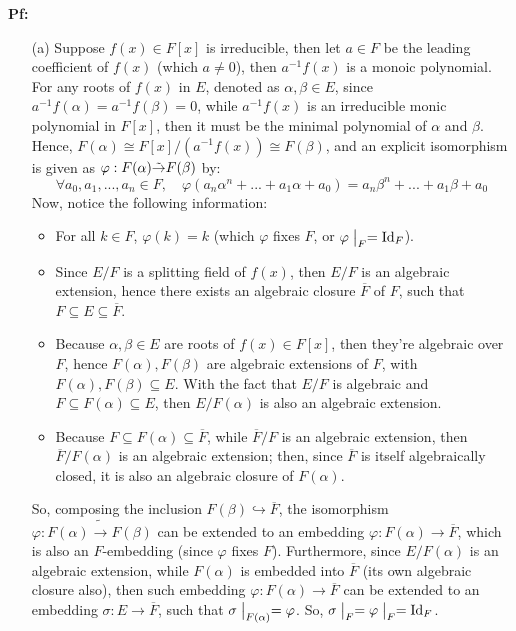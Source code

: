 \documentclass{article}
\begin{document}
\textbf{Pf:}
\begin{itemize}
    \item[(a)] Suppose $f(x)\in F[x]$ is irreducible, then let $a\in F$ be the leading coefficient of $f(x)$ (which $a\neq 0$), then $a^{-1}f(x)$ is a monoic polynomial. For any roots of $f(x)$ in $E$, denoted as $\alpha,\beta\in E$, since $a^{-1}f(\alpha)=a^{-1}f(\beta)=0$, while $a^{-1}f(x)$ is an irreducible monic polynomial in $F[x]$, then it must be the minimal polynomial of $\alpha$ and $\beta$. Hence, $F(\alpha)\cong F[x]/(a^{-1}f(x))\cong F(\beta)$, and an explicit isomorphism is given as $\varphi:F(\alpha)\Tilde{\rightarrow }F(\beta)$ by:
    $$\forall a_0,a_1,...,a_n\in F,\quad \varphi(a_n\alpha^n+...+a_1\alpha+a_0)=a_n\beta^n+...+a_1\beta+a_0$$
    Now, notice the following information:
    \begin{itemize}
        \item For all $k\in F$, $\varphi(k)=k$ (which $\varphi$ fixes $F$, or $\varphi\bigm|_{F}=\textmd{Id}_F$).
        \item Since $E/F$ is a splitting field of $f(x)$, then $E/F$ is an algebraic extension, hence there exists an algebraic closure $\overline{F}$ of $F$, such that $F\subseteq E\subseteq \overline{F}$.
        \item Because $\alpha,\beta\in E$ are roots of $f(x)\in F[x]$, then they're algebraic over $F$, hence $F(\alpha),F(\beta)$ are algebraic extensions of $F$, with $F(\alpha),F(\beta)\subseteq E$. With the fact that $E/F$ is algebraic and $F\subseteq F(\alpha)\subseteq E$, then $E/F(\alpha)$ is also an algebraic extension.
        \item Because $F\subseteq F(\alpha)\subseteq \overline{F}$, while $\overline{F}/F$ is an algebraic extension, then $\overline{F}/F(\alpha)$ is an algebraic extension; then, since $\overline{F}$ is itself algebraically closed, it is also an algebraic closure of $F(\alpha)$.
    \end{itemize}
    So, composing the inclusion $F(\beta)\hookrightarrow \overline{F}$, the isomorphism $\varphi:F(\alpha)\tilde{\rightarrow}F(\beta)$ can be extended to an embedding $\varphi:F(\alpha)\rightarrow \overline{F}$, which is also an $F$-embedding (since $\varphi$ fixes $F$). Furthermore, since $E/F(\alpha)$ is an algebraic extension, while $F(\alpha)$ is embedded into $\overline{F}$ (its own algebraic closure also), then such embedding $\varphi:F(\alpha)\rightarrow\overline{F}$ can be extended to an embedding $\sigma:E\rightarrow \overline{F}$, such that $\sigma\bigm|_{F(\alpha)} = \varphi$. So, $\sigma\bigm|_{F} = \varphi\bigm|_{F} = \textmd{Id}_F$.


\end{itemize}
\end{document}
